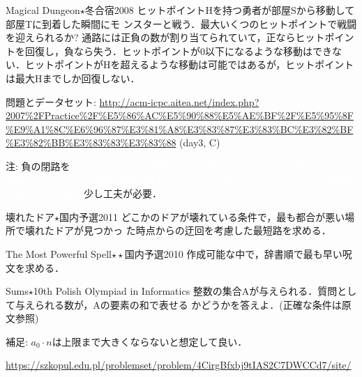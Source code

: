 \begin{pbox}{Magical Dungeon$\star$}{冬合宿2008}
  ヒットポイントHを持つ勇者が部屋Sから移動して部屋Tに到着した瞬間にモ
  ンスターと戦う．最大いくつのヒットポイントで戦闘を迎えられるか?
通路には正負の数が割り当てられていて，正ならヒットポイントを回復し，負なら失う．ヒットポイントが0以下になるような移動はできない．ヒットポイントがHを超えるような移動は可能ではあるが，ヒットポイントは最大Hまでしか回復しない．


問題とデータセット: \url{http://acm-icpc.aitea.net/index.php?2007\%2FPractice\%2F\%E5\%86\%AC\%E5\%90\%88\%E5\%AE\%BF\%2F\%E5\%95\%8F\%E9\%A1\%8C\%E6\%96\%87\%E3\%81\%A8\%E3\%83\%87\%E3\%83\%BC\%E3\%82\%BF\%E3\%82\%BB\%E3\%83\%83\%E3\%83\%88} (day3, C)
\end{pbox}

注: 負の閉路を\textcolor{white}{ぐるぐるまわって回復してから戦うようなケースを考える必要がある．
Bellman-Ford法の応用で解くことができるが，Hが大きいケースを効率的に対処するには，}少し工夫が必要．

\begin{pbox}{壊れたドア$\star$}{国内予選2011}
どこかのドアが壊れている条件で，最も都合が悪い場所で壊れたドアが見つかっ
た時点からの迂回を考慮した最短路を求める．

\end{pbox}

\begin{pbox}{The Most Powerful Spell$\star\star$}{国内予選2010}
作成可能な中で，辞書順で最も早い呪文を求める．

\end{pbox}

\begin{pbox}{Sums$\star$}{10th Polish Olympiad in Informatics}
整数の集合Aが与えられる．質問として与えられる数が，Aの要素の和で表せる
かどうかを答えよ．(正確な条件は原文参照)

補足: $a_0 \cdot n$は上限まで大きくならないと想定して良い．

\url{https://szkopul.edu.pl/problemset/problem/4CirgBfxbj9tIAS2C7DWCCd7/site/}
\end{pbox}
